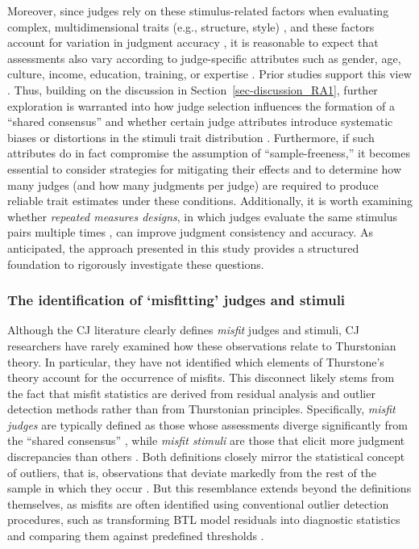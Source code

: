 \documentclass[
  authoryear,
  review,
  1p]{elsarticle}
\begin{document}
Moreover, since judges rely on these stimulus-related factors when
evaluating complex, multidimensional traits (e.g., structure, style)
\citep{vanDaal_et_al_2016, Lesterhuis_et_al_2018, Chambers_et_al_2022},
and these factors account for variation in judgment accuracy
\citep{Gill_et_al_2013, vanDaal_et_al_2017, vanDaal_2020, Gijsen_et_al_2021},
it is reasonable to expect that assessments also vary according to
judge-specific attributes such as gender, age, culture, income,
education, training, or expertise \citep{Kelly_et_al_2022}. Prior
studies support this view
\citep[e.g.,][]{Bartholomew_et_al_2020a, McMahon_et_al_2015}. Thus,
building on the discussion in Section~\ref{sec-discussion_RA1}, further
exploration is warranted into how judge selection influences the
formation of a ``shared consensus'' and whether certain judge attributes
introduce systematic biases or distortions in the stimuli trait
distribution \citep{Deffner_et_al_2022}. Furthermore, if such attributes
do in fact compromise the assumption of ``sample-freeness,'' it becomes
essential to consider strategies for mitigating their effects and to
determine how many judges (and how many judgments per judge) are
required to produce reliable trait estimates under these conditions.
Additionally, it is worth examining whether \emph{repeated measures
designs}, in which judges evaluate the same stimulus pairs multiple
times \citep{Lawson_2015}, can improve judgment consistency and
accuracy. As anticipated, the approach presented in this study provides
a structured foundation to rigorously investigate these questions.

\subsubsection{The identification of `misfitting' judges and
stimuli}\label{sec-discussion_RA3}

Although the CJ literature clearly defines \emph{misfit} judges and
stimuli, CJ researchers have rarely examined how these observations
relate to Thurstonian theory. In particular, they have not identified
which elements of Thurstone's theory account for the occurrence of
misfits. This disconnect likely stems from the fact that misfit
statistics are derived from residual analysis and outlier detection
methods rather than from Thurstonian principles. Specifically,
\emph{misfit judges} are typically defined as those whose assessments
diverge significantly from the ``shared consensus''
\citep{Pollitt_2012a, Pollitt_2012b, vanDaal_et_al_2016, Goossens_et_al_2018, Wu_et_al_2022},
while \emph{misfit stimuli} are those that elicit more judgment
discrepancies than others
\citep{Pollitt_2004, Pollitt_2012a, Pollitt_2012b, Goossens_et_al_2018}.
Both definitions closely mirror the statistical concept of outliers,
that is, observations that deviate markedly from the rest of the sample
in which they occur \citep{Grubbs_1969}. But this resemblance extends
beyond the definitions themselves, as misfits are often identified using
conventional outlier detection procedures, such as transforming BTL
model residuals into diagnostic statistics and comparing them against
predefined thresholds
\citep{Pollitt_2012a, Pollitt_2012b, Wu_et_al_2022}.
\end{document}
